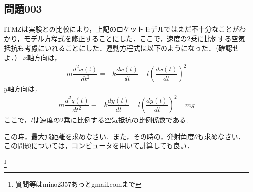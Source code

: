 \documentclass[12pt]{jarticle}
\begin{document}
\subsection*{問題003}
ITMZは実験との比較により，上記のロケットモデルではまだ不十分なことがわかり，モデル方程式を修正することにした．ここで，速度の2乗に比例する空気抵抗も考慮にいれることにした．運動方程式は以下のようになった．（確認せよ．）
$x$軸方向は，
\begin{align*}
m \dfrac{d^2 x(t)}{dt^2} = - k \dfrac{dx(t)}{dt} - l \left( \dfrac{dx(t)}{dt} \right)^2 
\end{align*}
$y$軸方向は，
\begin{align*}
m \dfrac{d^2 y(t)}{dt^2} = - k \dfrac{dy(t)}{dt} - l \left( \dfrac{dy(t)}{dt} \right)^2  - mg
\end{align*}
ここで，$l$は速度の2乗に比例する空気抵抗の比例係数である．

この時，最大飛距離を求めなさい．また，その時の，発射角度$\theta$も求めなさい．この問題については，コンピュータを用いて計算しても良い．

\footnote[0]{
質問等はmino2357あっとgmail.comまで
}

\thispagestyle{empty}
\end{document}
